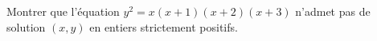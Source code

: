 Montrer que l'équation $y^2 = x(x+1)(x+2)(x+3)$ n'admet pas de solution $(x,y)$
en entiers strictement positifs.
